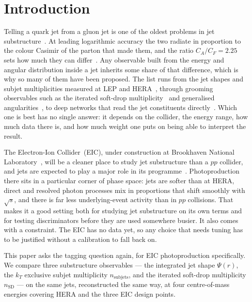 \documentclass[reprint,amsmath,amssymb,aps,prd,floatfix]{revtex4-2}
\begin{document}
\section{Introduction}\label{sec:intro}

Telling a quark jet from a gluon jet is one of the oldest problems in jet
substructure~\cite{Gallicchio_2013,gras2017systematics}. At leading logarithmic
accuracy the two radiate in proportion to the colour Casimir of the parton that
made them, and the ratio $C_A / C_F = 2.25$ sets how much they can
differ~\cite{Ellis:1991qcd,PDG_QCD}. Any observable built from the energy and
angular distribution inside a jet inherits some share of that difference, which
is why so many of them have been proposed. The list runs from the jet shapes and
subjet multiplicities measured at LEP and
HERA~\cite{opal1993study,aleph2000measurements,zeus1998measurement,Chekanov_2008},
through grooming observables such as the iterated soft-drop
multiplicity~\cite{Frye:2017yrw,Larkoski:2014wba} and generalised
angularities~\cite{Larkoski:2014gra}, to deep networks that read the jet
constituents directly~\cite{Komiske_2018,Metodiev_2018,larkoski2020jet}. Which
one is best has no single answer: it depends on the collider, the energy range,
how much data there is, and how much weight one puts on being able to interpret
the result.

The Electron-Ion Collider~(EIC), under construction at Brookhaven National
Laboratory~\cite{Accardi:2012qut,khalek2022science}, will be a cleaner place to
study jet substructure than a $pp$ collider, and jets are expected to play a
major role in its programme~\cite{PhysRevD_101,Arratia_2020}. Photoproduction
there sits in a particular corner of phase space:
jets are softer than at HERA, direct and resolved photon processes mix in
proportions that shift smoothly with $\sqrt{s}$, and there is far less
underlying-event activity than in $pp$ collisions. That makes it a good setting
both for studying jet substructure on its own terms and for testing
discriminators before they are used somewhere busier. It also comes with a
constraint. The EIC has no data yet, so any choice that needs tuning has to be
justified without a calibration to fall back on.

This paper asks the tagging question again, for EIC photoproduction
specifically. We compare three substructure observables --- the integrated jet
shape $\Psi(r)$, the $k_T$ exclusive subjet multiplicity
$n_{\mathrm{subjets}}$, and the iterated soft-drop multiplicity
$n_{\mathrm{SD}}$ --- on the same jets, reconstructed the same way, at four
centre-of-mass energies covering HERA and the three EIC design points.
\end{document}
